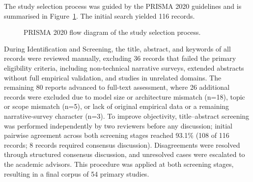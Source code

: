 The study selection process was guided by the PRISMA 2020 guidelines \cite{page2021prisma} and is summarised in Figure~\ref{fig:prisma}. The initial search yielded 116 records.

\begin{figure}[htbp]
\centering
{}
\caption{PRISMA 2020 flow diagram of the study selection process.}
\label{fig:prisma}
\end{figure} During Identification and Screening, the title, abstract, and keywords of all records were reviewed manually, excluding 36 records that failed the primary eligibility criteria, including non-technical narrative surveys, extended abstracts without full empirical validation, and studies in unrelated domains. The remaining 80 reports advanced to full-text assessment, where 26 additional records were excluded due to model size or architecture mismatch (n=18), topic or scope mismatch (n=5), or lack of original empirical data or a remaining narrative-survey character (n=3). To improve objectivity, title--abstract screening was performed independently by two reviewers before any discussion; initial pairwise agreement across both screening stages reached 93.1\% (108 of 116 records; 8 records required consensus discussion). Disagreements were resolved through structured consensus discussion, and unresolved cases were escalated to the academic advisors. This procedure was applied at both screening stages, resulting in a final corpus of 54 primary studies.

